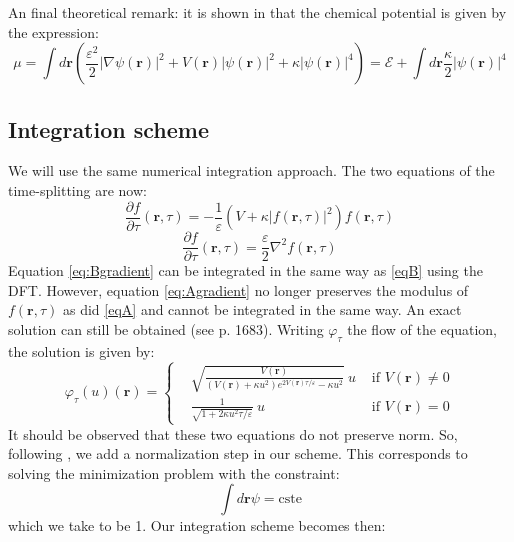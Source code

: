 \documentclass{article}
\begin{document}
\bigskip
An final theoretical remark: it is shown in \cite{bao2} that the chemical potential is given by the expression:
$$\mu=\int d\mathbf{r}\left(\frac{\varepsilon^2}{2}|\nabla\psi(\mathbf{r})|^2+V(\mathbf{r})|\psi(\mathbf{r})|^2+\kappa|\psi(\mathbf{r})|^4\right)=\mathcal{E}+\int d\mathbf{r}\frac{\kappa}{2}|\psi(\mathbf{r})|^4$$


\subsection{Integration scheme}
We will use the same numerical integration approach. The two equations of the time-splitting are now:
\begin{equation}\label{eq:Agradient}
   \frac{\partial f}{\partial \tau}(\mathbf{r},\tau)=-\frac{1}{\varepsilon}\left(V +\kappa|f(\mathbf{r},\tau)|^{2}\right) f(\mathbf{r},\tau)
\end{equation}
\begin{equation}\label{eq:Bgradient}
   \frac{\partial f}{\partial \tau}(\mathbf{r},\tau)=\frac{\varepsilon}{2} \nabla^{2} f(\mathbf{r},\tau)
\end{equation}
Equation \eqref{eq:Bgradient} can be integrated in the same way as \eqref{eqB} using the DFT. However, equation \eqref{eq:Agradient} no longer preserves the modulus of $f(\mathbf{r},\tau)$ as did \eqref{eqA} and cannot be integrated in the same way. An exact solution can still be obtained (see \cite{bao2} p. 1683). Writing $\varphi_\tau$ the flow of the equation, the solution is given by:
$$
\varphi_\tau(u)(\mathbf{r}) = \left\{
    \begin{aligned}
        & \sqrt{\frac{V(\mathbf{r})}{(V(\mathbf{r})+\kappa u^2)e^{2V(\mathbf{r})\tau/\varepsilon}-\kappa u^2}}~u & \text{   if } V(\mathbf{r})\neq 0 \\
        & \frac{1}{\sqrt{1+2\kappa u^2 \tau/\varepsilon}}~u & \text{   if } V(\mathbf{r})= 0
    \end{aligned}
\right.
$$
It should be observed that these two equations do not preserve norm. So, following \cite{bao2}, we add a normalization step in our scheme. This corresponds to solving the minimization problem with the constraint:
$$\int d\mathbf{r}\psi=\text{cste}$$
which we take to be 1. Our integration scheme becomes then:
\end{document}
